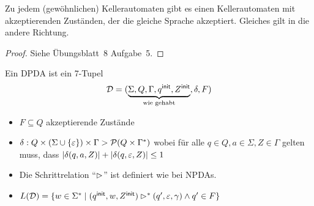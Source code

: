 \begin{lemma}
Zu jedem (gewöhnlichen) Kellerautomaten gibt es einen Kellerautomaten mit akzeptierenden Zuständen, der die gleiche Sprache akzeptiert.
Gleiches gilt in die andere Richtung.
\end{lemma}
\begin{proof}
Siehe Übungsblatt~8 Aufgabe~5.
\end{proof}




\begin{Def}[name={[DPDA]}]
        Ein \ac{DPDA} ist ein 7-Tupel
        $$\mathcal{D} = (\underbrace{\Sigma,Q,\Gamma,q^\mathsf{init},Z^\mathsf{init}}_{\text{wie gehabt}},\delta,F)$$
        \vspace{-1em}
        \begin{itemize}
        \item $F\subseteq Q$ akzeptierende Zustände
        \item $\delta: Q\times (\Sigma\cup\{\varepsilon\})\times \Gamma \-> \mathcal{P}(Q\times \Gamma^*)$ wobei für alle $q\in Q,a\in\Sigma,Z\in\Gamma$ gelten muss, dass
        $|\delta(q,a,Z)| + |\delta(q,\varepsilon,Z)| \leq 1$
        \item Die Schrittrelation "`$\rhd$"' ist definiert wie bei \ac{NPDA}s.
        \item $L(\mathcal{D}) = \{w\in\Sigma^* \mid (q^\mathsf{init},w,Z^\mathsf{init}) \rhd^* (q',\varepsilon,\gamma) \land q'\in F \}$ \qedhere
        \end{itemize}
\end{Def}

